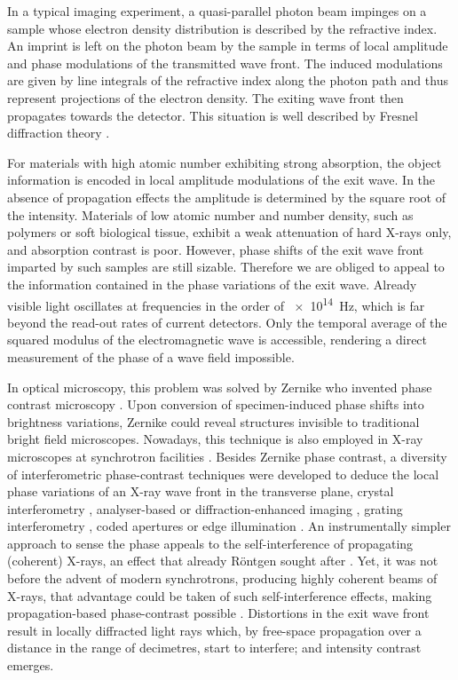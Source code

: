 \documentclass[
twoside,
openright,
titlepage,
numbers=noenddot,
headinclude,
fleqn,
a4paper,
footinclude=true,
cleardoublepage=empty,
abstractoff,
BCOR=5mm,
paper=a4,
fontsize=11pt,
british,ngerman,american,
]{scrreprt}
\begin{document}
In a typical imaging experiment, a quasi-parallel photon beam impinges
on a sample whose electron density distribution is described by the
refractive index.  An imprint is left on the photon beam by the sample
in terms of local amplitude and phase modulations of the transmitted
wave front.  The induced modulations are given by line integrals of
the refractive index along the photon path and thus represent
projections of the electron density.  The exiting wave front then
propagates towards the detector.  This situation is well described by
Fresnel diffraction theory \cite{HuygensYoungFresnel}.

For materials with high atomic number exhibiting strong absorption,
the object information is encoded in local amplitude modulations of
the exit wave.  In the absence of propagation effects the amplitude is
determined by the square root of the intensity.  Materials of low
atomic number and number density, such as polymers or soft biological
tissue, exhibit a weak attenuation of hard X-rays only, and absorption
contrast is poor.  However, phase shifts of the exit wave front
imparted by such samples are still sizable.  Therefore we are obliged
to appeal to the information contained in the phase variations of the
exit wave.  Already visible light oscillates at frequencies in the
order of \SI{e14}{Hz}, %
which is far beyond the read-out rates of current detectors.  Only the
temporal average of the squared modulus of the electromagnetic wave is
accessible, rendering a direct measurement of the phase of a wave
field impossible.

In optical microscopy, this problem was solved by Zernike who invented
phase contrast microscopy \cite{Zernike1942a, Zernike1942b,
  Zernike1955}.  Upon conversion of specimen-induced phase shifts into
brightness variations, Zernike could reveal structures invisible to
traditional bright field microscopes.  Nowadays, this technique is
also employed in X-ray microscopes at synchrotron facilities
\cite{Schmahl1994}.  Besides Zernike phase contrast, a diversity of
interferometric phase-contrast techniques were developed to deduce the
local phase variations of an X-ray wave front in the transverse plane,
\eg{} crystal interferometry \cite{BonseHart1965}, analyser-based or
diffraction-enhanced imaging \cite{Chapman1997}, grating
interferometry \cite{Momose2003}, coded apertures \cite{Olivo2008} or
edge illumination \cite{Pelliccia2013}.  An instrumentally simpler
approach to sense the phase appeals to the self-interference of
propagating (coherent) X-rays, an effect that already Röntgen sought
after \cite{Roentgen1896}.  Yet, it was not before the advent of
modern synchrotrons, producing highly coherent beams of X-rays, that
advantage could be taken of such self-interference effects, making
propagation-based phase-contrast possible
\cite{Snigirev1995,Wilkins1996,Paganin1998}.  Distortions in the exit
wave front result in locally diffracted light rays which, by
free-space propagation over a distance in the range of decimetres,
start to interfere; and intensity contrast emerges.
\end{document}
